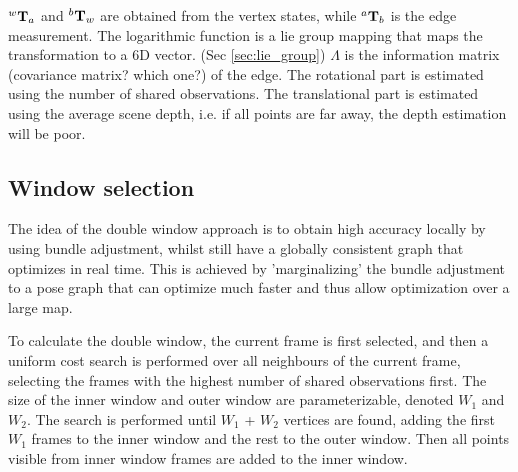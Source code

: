 $^{w}\mathbf T_{a}$ and $^{b} \mathbf T_{w}$ are obtained from the vertex states, while $^{a} \mathbf T_{b}$ is the edge measurement.  The logarithmic function is a lie group mapping that maps the transformation to a 6D vector. (Sec \ref{sec:lie_group})  $\Lambda$ is the information matrix (covariance matrix? which one?) of the edge.  The rotational part is estimated using the number of shared observations.  The translational part is estimated using the average scene depth, i.e. if all points are far away, the depth estimation will be poor.

\subsection{Window selection}

The idea of the double window approach is to obtain high accuracy locally by using bundle adjustment, whilst still have a globally consistent graph that optimizes in real time.  This is achieved by 'marginalizing' the bundle adjustment to a pose graph that can optimize much faster and thus allow optimization over a large map.

To calculate the double window, the current frame is first selected, and then a uniform cost search is performed over all neighbours of the current frame, selecting the frames with the highest number of shared observations first. The size of the inner window and outer window are parameterizable, denoted $W_1$ and $W_2$. The search is performed until $W_1$ + $W_2$ vertices are found, adding the first $W_1$ frames to the inner window and the rest to the outer window. Then all points visible from inner window frames are added to the inner window.  

